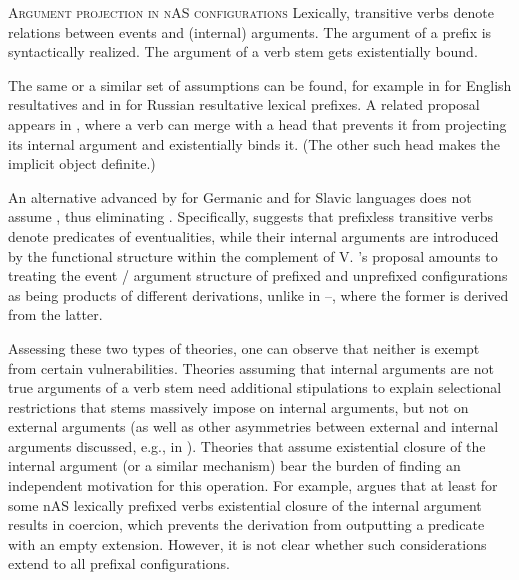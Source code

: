 \documentclass[output=paper,colorlinks,citecolor=brown]{langscibook}
\begin{document}
\eanoraggedright  \textsc{Argument projection in nAS configurations}\label{ex:tatevosov:90}
\eanoraggedright Lexically, transitive verbs denote relations between events and (internal)     arguments.\label{ex:tatevosov:90a}
\ex The argument of a prefix is syntactically realized.\label{ex:tatevosov:90b}
\ex The argument of a verb stem gets existentially bound.\label{ex:tatevosov:90c}
\z
\z

\noindent The same or a similar set of assumptions can be found, for example in \citet{Rothstein2004} for English resultatives and in \citet[53]{BabkoMalaya1999}  for Russian resultative lexical prefixes. A related proposal appears in \citet{Bruening2021}, where a verb can merge with a head that prevents it from projecting its internal argument and existentially binds it. (The other such head makes the implicit object definite.)

An alternative advanced by \citet{Kratzer2005} for Germanic and \citet{Biskup2019} for Slavic languages does not assume , thus eliminating . Specifically, \citet[48-50]{Biskup2019} suggests that prefixless transitive verbs denote predicates of eventualities, while their internal arguments are introduced by the functional structure within the complement of V. \citeauthor{Biskup2019}’s proposal amounts to treating the event /  argument structure of prefixed and unprefixed configurations as being products of different derivations, unlike in --, where the former is derived from the latter.

Assessing these two types of theories, one can observe that neither is exempt from certain vulnerabilities. Theories assuming that internal arguments are not true arguments of a verb stem need additional stipulations to explain selectional restrictions that stems massively impose on internal arguments, but not on external arguments (as well as other asymmetries between external and internal arguments discussed, e.g., in \citealt{Kratzer2003}). Theories that assume existential closure of the internal argument (or a similar mechanism) bear the burden of finding an independent motivation for this operation. For example, \citet{Tatevosov2015a} argues that at least for some nAS lexically prefixed verbs existential closure of the internal argument results in coercion, which prevents the derivation from outputting a predicate with an empty extension. However, it is not clear whether such considerations extend to all prefixal configurations.
\end{document}
